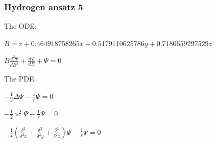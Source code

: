 \documentclass{beamer}
\begin{document}
\begin{frame}[fragile]
\frametitle{Hydrogen ansatz 5}

The ODE:
\vskip 20pt
\centerline{$B = r + 0.464918758265 x + 0.5179110625786 y + 0.7180659297529 z$}
\vskip 20pt
\centerline{$B \frac{d^2\Psi}{dB^2} + \frac{d\Psi}{dB} + \Psi = 0$}
\vskip 20pt

The PDE:

\vskip 20pt

\centerline{$-\frac{1}{2} \Delta \Psi - \frac{1}{r}\Psi = 0$}
\vskip 20pt
\centerline{$-\frac{1}{2} \triangledown^2 \Psi - \frac{1}{r}\Psi = 0$}
\vskip 20pt

\centerline{$-\frac{1}{2} \left(\frac{\delta^2}{\delta^2 x} + \frac{\delta^2}{\delta^2 y} + \frac{\delta^2}{\delta^2 z}\right) \Psi - \frac{1}{r}\Psi = 0$}



\end{frame}
\end{document}
